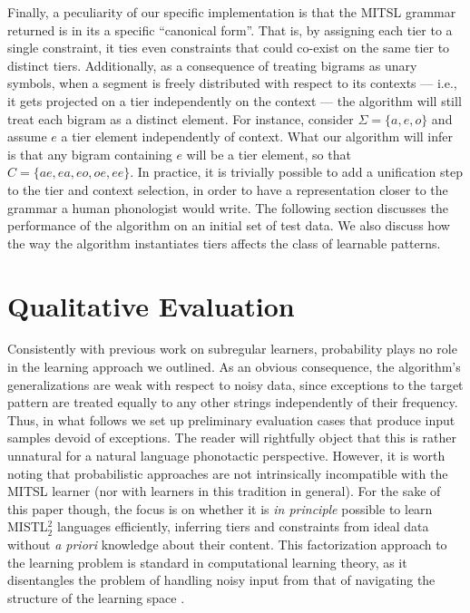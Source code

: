 \documentclass[11pt,a4paper]{article}
\begin{document}
Finally, a peculiarity of our specific implementation is that the MITSL grammar returned is in its a specific ``canonical form''.
That is, by assigning each tier to a single constraint,  it ties even  constraints that could co-exist on the same tier to distinct tiers.
Additionally, as a consequence of treating bigrams as unary symbols,  when a segment is freely distributed with respect to its contexts --- i.e., it gets projected on a tier independently on the context --- the algorithm will still treat each bigram as a distinct element.
For instance, consider $\Sigma =\{ a, e, o \}$ and assume  $e$ a tier element independently of context.
What our algorithm will infer is that any bigram containing $e$ will be a tier element, so that $C = \{ ae, ea, eo, oe, ee\}$.\@
In practice, it is trivially possible to add a unification step to the tier and context selection, in order to have a representation closer to the grammar a human phonologist would write.
The following section discusses the performance of the algorithm on an initial set of test data.
We also discuss how the way the algorithm instantiates tiers affects the class of learnable patterns.


\section{Qualitative Evaluation}

Consistently with previous work on subregular learners,  probability plays no role in the learning approach we outlined.
As an obvious consequence, the algorithm's generalizations are weak with respect to noisy data, since exceptions to the target pattern are treated equally to any other strings independently of their frequency.
Thus, in what follows we set up preliminary evaluation cases that produce input samples devoid of exceptions.
The reader will rightfully object that this is rather unnatural for a natural language phonotactic perspective.
However, it is worth noting that probabilistic approaches are not intrinsically incompatible with the MITSL learner (nor with learners in this tradition in general).
For the sake of this paper though, the focus is on whether it is  \emph{in principle} possible to learn MISTL$^2_2$ languages efficiently, inferring  tiers and constraints from ideal data without \emph{a priori} knowledge about their content.
This  factorization approach to the learning problem is standard in computational learning theory, as it disentangles the problem of handling noisy input from that of navigating the structure of the learning space \cite[a.o.]{OncinaGarcia91,jardine2016learning,JardineHeinz16}.
\end{document}
